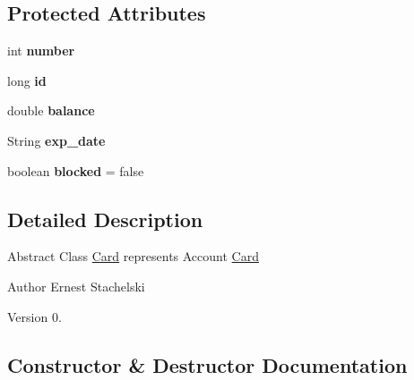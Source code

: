 \subsection*{Protected Attributes}
\begin{DoxyCompactItemize}
\item 
\mbox{\label{classmodules_1_1bank_1_1_card_af4a87d2221c15317c9baf2c8003069d3}} 
int {\bfseries number}
\item 
\mbox{\label{classmodules_1_1bank_1_1_card_ac8fef3d0557ee5cdf61aba050f0fd19d}} 
long {\bfseries id}
\item 
\mbox{\label{classmodules_1_1bank_1_1_card_aed43b7a2f26e6473067b57a155987e23}} 
double {\bfseries balance}
\item 
\mbox{\label{classmodules_1_1bank_1_1_card_a61725dc4f6f2dce3b8d78eb8523645b8}} 
String {\bfseries exp\+\_\+date}
\item 
\mbox{\label{classmodules_1_1bank_1_1_card_aa5ff463df6e0a2b49513652b9435955b}} 
boolean {\bfseries blocked} = false
\end{DoxyCompactItemize}


\subsection{Detailed Description}
Abstract Class \mbox{\hyperlink{classmodules_1_1bank_1_1_card}{Card}} represents Account \mbox{\hyperlink{classmodules_1_1bank_1_1_card}{Card}} \begin{DoxyAuthor}{Author}
Ernest Stachelski 
\end{DoxyAuthor}
\begin{DoxyVersion}{Version}
0. 
\end{DoxyVersion}


\subsection{Constructor \& Destructor Documentation}
\mbox{\label{classmodules_1_1bank_1_1_card_a19e7ab54952594ea01d2f79bc984b4d1}} 

